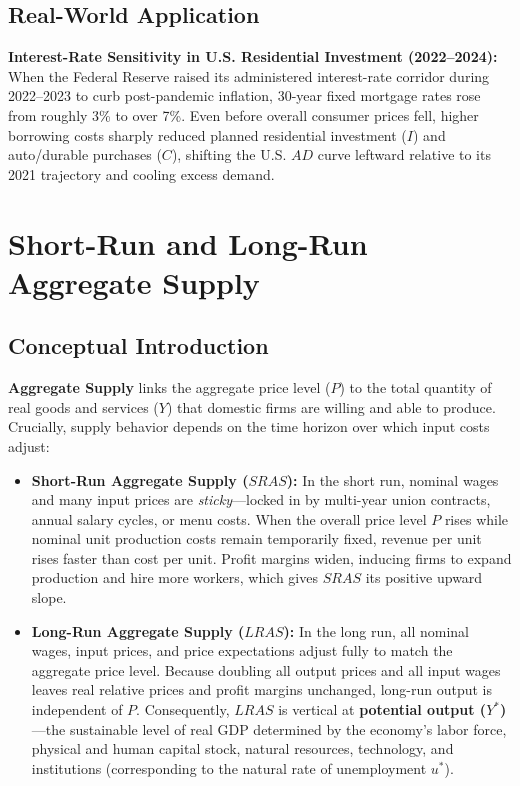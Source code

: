 \documentclass[11pt,letterpaper]{article}
\begin{document}
\subsection*{Real-World Application}
\textbf{Interest-Rate Sensitivity in U.S. Residential Investment (2022--2024):} When the Federal Reserve raised its administered interest-rate corridor during 2022--2023 to curb post-pandemic inflation, 30-year fixed mortgage rates rose from roughly 3\% to over 7\%. Even before overall consumer prices fell, higher borrowing costs sharply reduced planned residential investment ($I$) and auto/durable purchases ($C$), shifting the U.S. $AD$ curve leftward relative to its 2021 trajectory and cooling excess demand.

\section{Short-Run and Long-Run Aggregate Supply}

\subsection*{Conceptual Introduction}
\textbf{Aggregate Supply} links the aggregate price level ($P$) to the total quantity of real goods and services ($Y$) that domestic firms are willing and able to produce. Crucially, supply behavior depends on the time horizon over which input costs adjust:
\begin{itemize}
    \item \textbf{Short-Run Aggregate Supply ($SRAS$):} In the short run, nominal wages and many input prices are \emph{sticky}—locked in by multi-year union contracts, annual salary cycles, or menu costs. When the overall price level $P$ rises while nominal unit production costs remain temporarily fixed, revenue per unit rises faster than cost per unit. Profit margins widen, inducing firms to expand production and hire more workers, which gives $SRAS$ its positive upward slope.
    \item \textbf{Long-Run Aggregate Supply ($LRAS$):} In the long run, all nominal wages, input prices, and price expectations adjust fully to match the aggregate price level. Because doubling all output prices and all input wages leaves real relative prices and profit margins unchanged, long-run output is independent of $P$. Consequently, $LRAS$ is vertical at \textbf{potential output ($Y^*$)}—the sustainable level of real GDP determined by the economy's labor force, physical and human capital stock, natural resources, technology, and institutions (corresponding to the natural rate of unemployment $u^*$).
\end{itemize}
\end{document}
